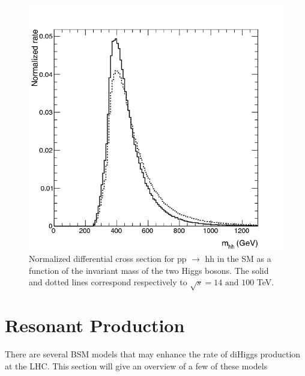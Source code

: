 \begin{figure}[h]
\begin{center}
\includegraphics[scale=0.3]{figures/SM_continuum}
\caption{ Normalized differential cross section for pp ${\rightarrow}$ hh in the SM as a function of the invariant mass of the two Higgs bosons. The solid and dotted lines correspond respectively to ${\sqrt{s} = 14 \textrm{ and } 100}$ TeV.\cite{azatov:2015}}
\label{fig:SM_cont}
\end{center}
\end{figure}


\section{Resonant Production}
There are several BSM models that may enhance the rate of diHiggs production at the LHC. This section will give an overview of a few of these models
